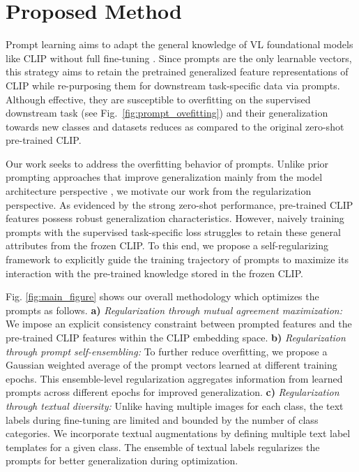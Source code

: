 \documentclass[10pt,twocolumn,letterpaper]{article}
\begin{document}
\section{Proposed Method}
\label{sec: Methodology}

Prompt learning aims to adapt the general knowledge of VL foundational models like CLIP without full fine-tuning \cite{zhou2022learning, zhou2022conditional, chen2022prompt}. Since prompts are the only learnable vectors, this strategy aims to retain the pretrained generalized feature representations of CLIP while re-purposing them for downstream task-specific data via prompts. Although effective, they are susceptible to overfitting on the supervised downstream task (see Fig.~\ref{fig:prompt_ovefitting}) and their generalization towards new classes and datasets reduces as compared to the original zero-shot pre-trained CLIP. 

Our work seeks to address the overfitting behavior of prompts.
Unlike prior prompting approaches that improve generalization mainly from the model architecture perspective \cite{zhou2022conditional, khattak2023maple}, we motivate our work from the regularization perspective. 
As evidenced by the strong zero-shot performance, pre-trained CLIP features possess robust generalization characteristics. However, naively training prompts with the supervised task-specific loss struggles to retain these general attributes from the frozen CLIP. To this end, we propose a self-regularizing framework to explicitly guide the training trajectory of prompts to maximize its interaction with the pre-trained knowledge stored in the frozen CLIP.

Fig. \ref{fig:main_figure} shows our overall methodology which optimizes the prompts as follows. \textbf{a)} \emph{Regularization through mutual agreement maximization:} We impose an explicit consistency constraint between prompted features and the pre-trained CLIP features within the CLIP embedding space. \textbf{b)} \emph{Regularization through prompt self-ensembling:} To further reduce overfitting, we propose a Gaussian weighted average of the prompt vectors learned at different training epochs. This ensemble-level regularization aggregates information from learned prompts across different epochs for improved generalization. \textbf{c)} \emph{Regularization through textual diversity:} Unlike having multiple images for each class, the text labels during fine-tuning are limited and bounded by the number of class categories. We incorporate textual augmentations by defining multiple text label templates for a given class. The ensemble of textual labels regularizes the prompts for better generalization during optimization.
\end{document}
